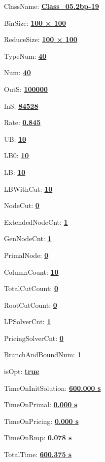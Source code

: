 \documentclass[11pt]{article}
\begin{document}
\pagestyle{empty}


ClassName: \underline{\textbf{Class_05.2bp-19}}
\par
BinSize: \underline{\textbf{100 × 100}}
\par
ReduceSize: \underline{\textbf{100 × 100}}
\par
TypeNum: \underline{\textbf{40}}
\par
Num: \underline{\textbf{40}}
\par
OutS: \underline{\textbf{100000}}
\par
InS: \underline{\textbf{84528}}
\par
Rate: \underline{\textbf{0.845}}
\par
UB: \underline{\textbf{10}}
\par
LB0: \underline{\textbf{10}}
\par
LB: \underline{\textbf{10}}
\par
LBWithCut: \underline{\textbf{10}}
\par
NodeCut: \underline{\textbf{0}}
\par
ExtendedNodeCnt: \underline{\textbf{1}}
\par
GenNodeCnt: \underline{\textbf{1}}
\par
PrimalNode: \underline{\textbf{0}}
\par
ColumnCount: \underline{\textbf{10}}
\par
TotalCutCount: \underline{\textbf{0}}
\par
RootCutCount: \underline{\textbf{0}}
\par
LPSolverCnt: \underline{\textbf{1}}
\par
PricingSolverCnt: \underline{\textbf{0}}
\par
BranchAndBoundNum: \underline{\textbf{1}}
\par
isOpt: \underline{\textbf{true}}
\par
TimeOnInitSolution: \underline{\textbf{600.000 s}}
\par
TimeOnPrimal: \underline{\textbf{0.000 s}}
\par
TimeOnPricing: \underline{\textbf{0.000 s}}
\par
TimeOnRmp: \underline{\textbf{0.078 s}}
\par
TotalTime: \underline{\textbf{600.375 s}}
\par
\newpage


\end{document}
